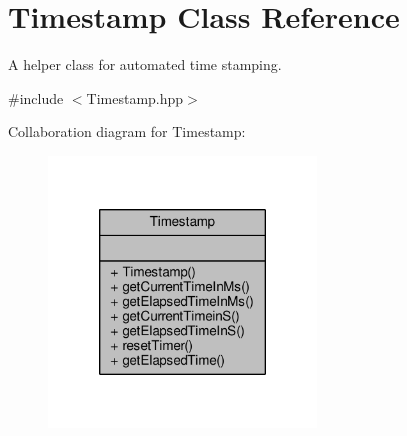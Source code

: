 \hypertarget{classTimestamp}{\section{Timestamp Class Reference}
\label{classTimestamp}
}


A helper class for automated time stamping.  




{\ttfamily \#include $<$Timestamp.\-hpp$>$}



Collaboration diagram for Timestamp\-:\nopagebreak
\begin{figure}[H]
\begin{center}
\leavevmode
\includegraphics[width=202pt]{classTimestamp__coll__graph}
\end{center}
\end{figure}

